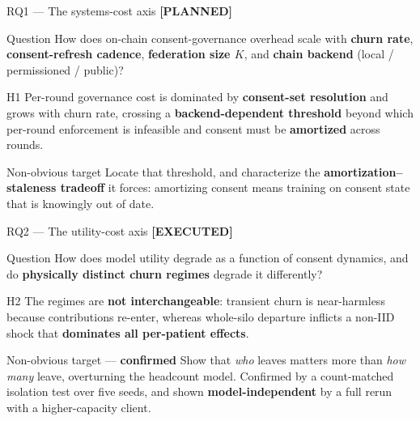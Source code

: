 \documentclass[aspectratio=169, 11pt]{beamer}
\newcommand{\donelight}{{\color{white}\textbf{[EXECUTED]}}}
\newcommand{\plannedlight}{{\color{mLight}\textbf{[PLANNED]}}}
\begin{document}
\begin{frame}{RQ1 --- The systems-cost axis \hfill \plannedlight}
\begin{block}{Question}
How does on-chain consent-governance overhead scale with \textbf{churn rate},
\textbf{consent-refresh cadence}, \textbf{federation size $K$}, and
\textbf{chain backend} (local / permissioned / public)?
\end{block}
\begin{alertblock}{H1}
Per-round governance cost is dominated by \textbf{consent-set resolution} and
grows with churn rate, crossing a \textbf{backend-dependent threshold} beyond
which per-round enforcement is infeasible and consent must be
\textbf{amortized} across rounds.
\end{alertblock}
\begin{exampleblock}{Non-obvious target}
Locate that threshold, and characterize the
\textbf{amortization--staleness tradeoff} it forces: amortizing consent
means training on consent state that is knowingly out of date.
\end{exampleblock}
\end{frame}

\begin{frame}{RQ2 --- The utility-cost axis \hfill \donelight}
\begin{block}{Question}
How does model utility degrade as a function of consent dynamics, and do
\textbf{physically distinct churn regimes} degrade it differently?
\end{block}
\vspace{-0.2em}
\begin{alertblock}{H2}
The regimes are \textbf{not interchangeable}: transient churn is near-harmless
because contributions re-enter, whereas whole-silo departure inflicts a
non-IID shock that \textbf{dominates all per-patient effects}.
\end{alertblock}
\vspace{-0.2em}
\begin{exampleblock}{Non-obvious target --- \textbf{confirmed}}
Show that \emph{who} leaves matters more than \emph{how many} leave,
overturning the headcount model. Confirmed by a count-matched isolation test
over five seeds, and shown \textbf{model-independent} by a full rerun with a
higher-capacity client.
\end{exampleblock}
\end{frame}
\end{document}
